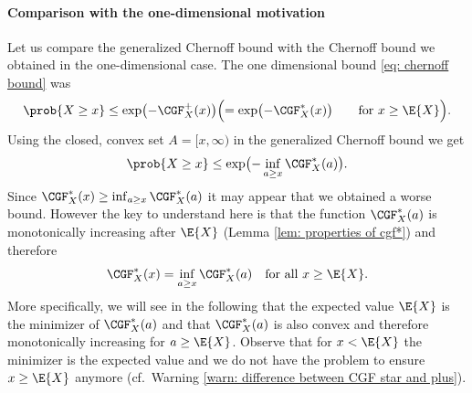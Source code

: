 \paragraph*{Comparison with the one-dimensional motivation}
Let us compare the generalized Chernoff bound with the Chernoff bound
we obtained in the one-dimensional case. The one dimensional bound \eqref{eq: chernoff bound}
was
\[
    \prob{X \ge x} \le \exp\bigl(-\CGF_X^+(x)\bigr)
    \Bigl(= \exp\bigl(-\CGF_X^*(x)\bigr) \qquad \text{for } x \ge \E{X}\Bigr).
\]
Using the closed, convex set \(A=[x, \infty)\) in the generalized Chernoff bound we get
\[
    \prob{X \ge x} \le \exp\bigl(-\inf_{a\ge x} \CGF_X^*(a)\bigr).
\]
Since \(\CGF_X^*(x) \ge \inf_{a\ge x} \CGF_X^*(a)\) it may appear
that we obtained a worse bound. However the key to understand here is that the
function \(\CGF_X^*(a)\) is monotonically increasing after \(\E{X}\) (Lemma \ref{lem: properties of cgf*}) 
and therefore
\[
    \CGF_X^*(x) = \inf_{a\ge x} \CGF_X^*(a) \quad \text{for all } x \ge \E{X}.
\]
More specifically, we will see in the following that the expected value \(\E{X}\)
is the minimizer of \(\CGF_X^*(a)\) and that \(\CGF_X^*(a)\) is also convex and therefore
monotonically increasing for \(a \ge \E{X}\). Observe that for \(x< \E{X}\)
the minimizer is the expected value and we do not have the problem to ensure \(x
\ge \E{X}\) anymore (cf.~Warning \ref{warn: difference between CGF star and
plus}).

